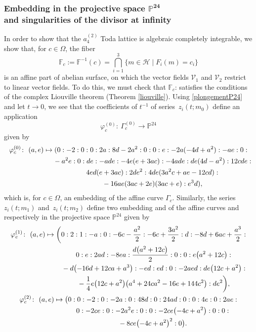 \documentclass[pdftex]{sigma}
\numberwithin{equation}{section}
\begin{document}
\subsubsection[Embedding in the projective space P\^{}{24} and singularities of the divisor at infinity]{Embedding in the projective space $\boldsymbol{\mathbb{P}^{24}}$\\ and singularities of the divisor at infinity}
 In order to show that the $a_4^{(2)}$ Toda lattice is algebraic completely integrable, we show
that, for $c\in \Omega$, the fiber
 \[\mathbb{F}_c:= \mathbb{F}^{-1}(c)=\bigcap_{i=1}^3 \{m\in \mathcal{H}\mid F_i(m)=c_i\} \]
is an affine part of abelian surface, on which the vector fields
$\mathcal{V}_1$ and $\mathcal{V}_2$ restrict to linear vector
fields. To do this, we must check that $\mathbb{F}_c$: satisfies the
conditions of the complex Liouville theorem (Theorem
\eqref{liouville}).
 Using
 \eqref{plongementP24} and let $t \rightarrow 0$, we see that the coefficients of
 $t^{-1}$ of series~$z_i(t;m_0)$ define an application
 \[\varphi_c^{(0)}\colon \ \Gamma_c^{(0)}\longrightarrow \mathbb{P}^{24}\] given by
 \begin{gather}
 \varphi_c^{(0)}\colon \ (a,e) \mapsto (0:-2:0:0:2a:8d-2a^2:0:0:e:-2a(-4d+a^2):-ae:0: \nonumber\\
 \hphantom{\varphi_c^{(0)}\colon \ (a,e) \mapsto (}{} -a^2e:0:de:-ade:-4e(e+3ac):-4ade:de(4d-a^2):12cde: \nonumber\\
 \hphantom{\varphi_c^{(0)}\colon \ (a,e) \mapsto (}{} 4ed(e+3ac):2de^2:4de(3a^2c+ae-12cd): \nonumber\\
 \hphantom{\varphi_c^{(0)}\colon \ (a,e) \mapsto (}{} -16ae(3ac+2e)(3ac+e):e^3d),\label{plongementphi0}
 \end{gather}
which is, for $c\in \Omega$, an embedding of the affine curve
$\Gamma_c$. Similarly, the series~$z_i(t;m_1)$ and~$z_i(t;m_2)$ define two embedding
 and  of the
affine curves  and
 respectively in the projective space
$\mathbb{P}^{24}$ given by
 \begin{gather}
\varphi_c^{(1)}\colon \ (a,e) \mapsto \biggl(0:2:1:-a:0:-6c-\frac{a^2}{2}:-6c+\frac{3a^2}{2}:d:-8d+6ac+\frac{a^3}{2}: \nonumber\\
 \hphantom{\varphi_c^{(1)}\colon \ (a,e) \mapsto\biggl(}{}
 0:e:2ad:-8ea:\frac{d\bigl(a^2+12c\bigr)}{2}:0:0:e\bigl(a^2+12c\bigr): \nonumber\\
 \hphantom{\varphi_c^{(1)}\colon \ (a,e) \mapsto\biggl(}{}
 -d\bigl(-16d+12ca+a^3\bigr):-ed:ed:0:-2aed:de\bigl(12c+a^2\bigr): \nonumber\\
 \hphantom{\varphi_c^{(1)}\colon \ (a,e) \mapsto\biggl(}{}
 -\frac{1}{4}e\bigl(12c+a^2\bigr)\bigl(a^4+24ca^2-16e+144c^2\bigr):de^2\biggr),\label{plongementphi1}\\
\varphi_c^{(2)}\colon \ (a,e) \mapsto \bigl(0:0:-2: 0:-2a:0:48d:0:24ad:0:0:4e:0:2ae: \nonumber\\
 \hphantom{\varphi_c^{(2)}\colon \ (a,e) \mapsto\bigl(}{}
 0:-2ce:0:-2a^2e:0:0:-2ce\bigl(-4c+a^2\bigr):0:0: \nonumber\\
 \hphantom{\varphi_c^{(2)}\colon \ (a,e) \mapsto\bigl(}{}
 -8ce\bigl(-4c+a^2\bigr)^2:0\bigr). \label{plongementphi2}
\end{gather}
\end{document}
